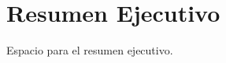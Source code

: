 \documentclass[12pt,a4paper,oneside]{report}
\begin{document}


\chapter*{Resumen Ejecutivo}
Espacio para el resumen ejecutivo.

\tableofcontents
\clearpage
\listoffigures
\clearpage
\listoftables
\clearpage










% 
% 

\appendix



\end{document}
